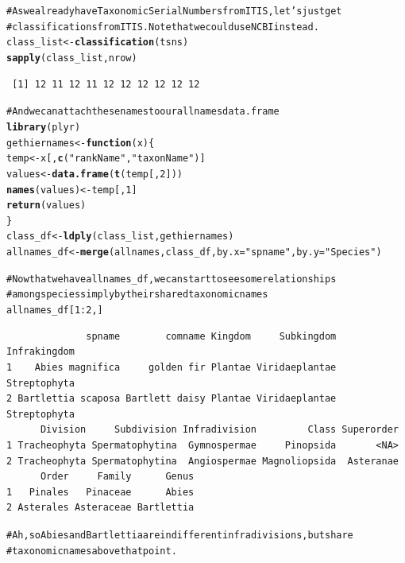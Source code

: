 \documentclass[letterpaper,superscriptaddress,showkeys,longbibliography,10pt]{revtex4-1}\usepackage{graphicx, color}
\makeatletter
\newcommand{\hlfunctioncall}[1]{\textcolor[rgb]{0.501960784313725,0,0.329411764705882}{\textbf{#1}}}%
\newcommand{\hlstring}[1]{\textcolor[rgb]{0.6,0.6,1}{#1}}%
\newcommand{\hlcomment}[1]{\textcolor[rgb]{0.180392156862745,0.6,0.341176470588235}{#1}}%
\newenvironment{kframe}{%
 \def\at@end@of@kframe{}%
 \ifinner\ifhmode%
  \def\at@end@of@kframe{\end{minipage}}%
  \begin{minipage}{\columnwidth}%
 \fi\fi%
 \def\FrameCommand##1{\hskip\@totalleftmargin \hskip-\fboxsep
 \colorbox{shadecolor}{##1}\hskip-\fboxsep
     \hskip-\linewidth \hskip-\@totalleftmargin \hskip\columnwidth}%
 \MakeFramed {\advance\hsize-\width
   \@totalleftmargin\z@ \linewidth\hsize
   \@setminipage}}%
 {\par\unskip\endMakeFramed%
 \at@end@of@kframe}
\newenvironment{knitrout}{}{} %
\makeatother
\begin{document}
\begin{knitrout}
\color{fgcolor}\begin{kframe}
\begin{alltt}
\hlcomment{# As we already have Taxonomic Serial Numbers from ITIS, let's just get}
\hlcomment{# classifications from ITIS. Note that we could use NCBI instead.}
class_list <- \hlfunctioncall{classification}(tsns)
\hlfunctioncall{sapply}(class_list, nrow)
\end{alltt}
\begin{verbatim}
 [1] 12 11 12 11 12 12 12 12 12 12
\end{verbatim}
\begin{alltt}

\hlcomment{# And we can attach these names to our allnames data.frame}
\hlfunctioncall{library}(plyr)
gethiernames <- \hlfunctioncall{function}(x) \{
    temp <- x[, \hlfunctioncall{c}(\hlstring{"rankName"}, \hlstring{"taxonName"})]
    values <- \hlfunctioncall{data.frame}(\hlfunctioncall{t}(temp[, 2]))
    \hlfunctioncall{names}(values) <- temp[, 1]
    \hlfunctioncall{return}(values)
\}
class_df <- \hlfunctioncall{ldply}(class_list, gethiernames)
allnames_df <- \hlfunctioncall{merge}(allnames, class_df, by.x = \hlstring{"spname"}, by.y = \hlstring{"Species"})

\hlcomment{# Now that we have allnames_df, we can start to see some relationships}
\hlcomment{# among species simply by their shared taxonomic names}
allnames_df[1:2, ]
\end{alltt}
\begin{verbatim}
              spname        comname Kingdom     Subkingdom Infrakingdom
1    Abies magnifica     golden fir Plantae Viridaeplantae Streptophyta
2 Bartlettia scaposa Bartlett daisy Plantae Viridaeplantae Streptophyta
      Division     Subdivision Infradivision         Class Superorder
1 Tracheophyta Spermatophytina  Gymnospermae     Pinopsida       <NA>
2 Tracheophyta Spermatophytina  Angiospermae Magnoliopsida  Asteranae
      Order     Family      Genus
1   Pinales   Pinaceae      Abies
2 Asterales Asteraceae Bartlettia
\end{verbatim}
\begin{alltt}

\hlcomment{# Ah, so Abies and Bartlettia are in different infradivisions, but share}
\hlcomment{# taxonomic names above that point.}
\end{alltt}
\end{kframe}
\end{knitrout}
\end{document}
